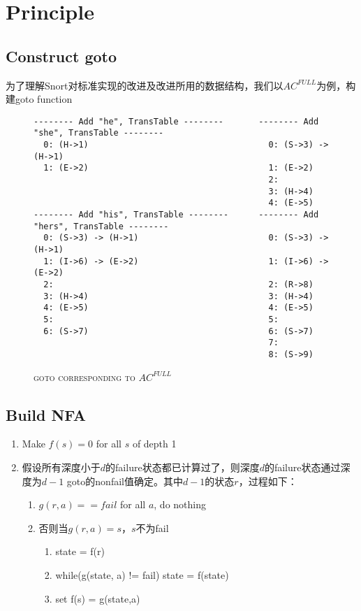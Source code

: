 \documentclass{article}
\begin{document}
\section{Principle}

\subsection{Construct goto}
为了理解Snort对标准实现的改进及改进所用的数据结构，我们以$AC^{FULL}$为例，构建goto function

\begin{figure}[h]
  \centering
\caption{\textsc{goto corresponding to $AC^{FULL}$}}
\begin{verbatim}
-------- Add "he", TransTable --------       -------- Add "she", TransTable --------
  0: (H->1)                                    0: (S->3) -> (H->1)
  1: (E->2)                                    1: (E->2)
                                               2:
                                               3: (H->4)
                                               4: (E->5)
-------- Add "his", TransTable --------      -------- Add "hers", TransTable --------
  0: (S->3) -> (H->1)                          0: (S->3) -> (H->1)
  1: (I->6) -> (E->2)                          1: (I->6) -> (E->2)
  2:                                           2: (R->8)
  3: (H->4)                                    3: (H->4)
  4: (E->5)                                    4: (E->5)
  5:                                           5:
  6: (S->7)                                    6: (S->7)
                                               7:
                                               8: (S->9)
\end{verbatim}
\end{figure}

\subsection{Build NFA}
\begin{enumerate}
  \item Make $f(s) = 0$ for all $s$ of depth 1
  \item 假设所有深度小于$d$的failure状态都已计算过了，则深度$d$的failure状态通过深度为$d-1$ goto的nonfail值确定。其中$d-1$的状态$r$，过程如下：
 \begin{enumerate}
    \item $g(r,a) == fail$ for all $a$, do nothing
    \item 否则当$g(r, a) = s$，$s$不为fail
      \begin{enumerate}
        \item state = f(r)
        \item while(g(state, a) != fail) state = f(state)
        \item set f(s) = g(state,a)
      \end{enumerate}
 \end{enumerate}
\end{enumerate}
\end{document}
